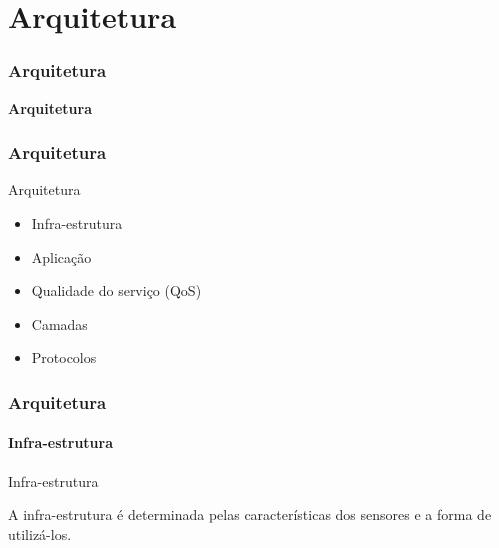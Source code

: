 \documentclass[notes]{beamer}
\begin{document}
\section{Arquitetura}
\begin{frame}
\label{slide_32}
\frametitle{Arquitetura}

\begin{block}

 \center \textbf{Arquitetura}
 
\end{block}

\end{frame}

\begin{frame}
\label{slide_33}
\frametitle{Arquitetura}

\begin{block}{Arquitetura}

\begin{itemize}

\item Infra-estrutura \pause

\item Aplicação \pause

\item Qualidade do serviço (QoS) \pause

\item Camadas \pause

\item Protocolos 

\end{itemize}

\end{block}

\end{frame}

\begin{frame}
\label{slide_34}
\frametitle{Arquitetura}
\framesubtitle{Infra-estrutura}

\begin{block}{Infra-estrutura}

A infra-estrutura é determinada pelas características dos sensores e a forma de utilizá-los.

\end{block}

\end{frame}
\end{document}
